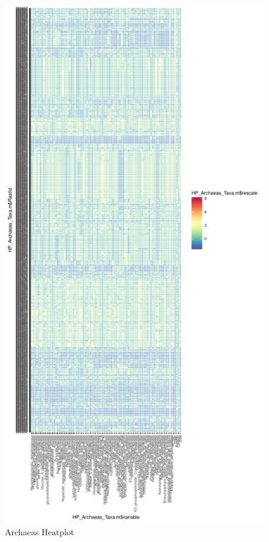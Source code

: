 \documentclass[12pt,twoside]{reedthesis}
\begin{document}
  \begin{figure}[h!tbp]
  \centering
  \includegraphics[angle = 0,scale = 0.6]{chapter2/Archaeas/ArchaeasHeatPlot.pdf}
  \caption[Archaeas Heatplot]{\normalsize{Archaeas Heatplot}}
  \label{fig:ArchaeaPlot}
  \end{figure}
  
\end{document}
